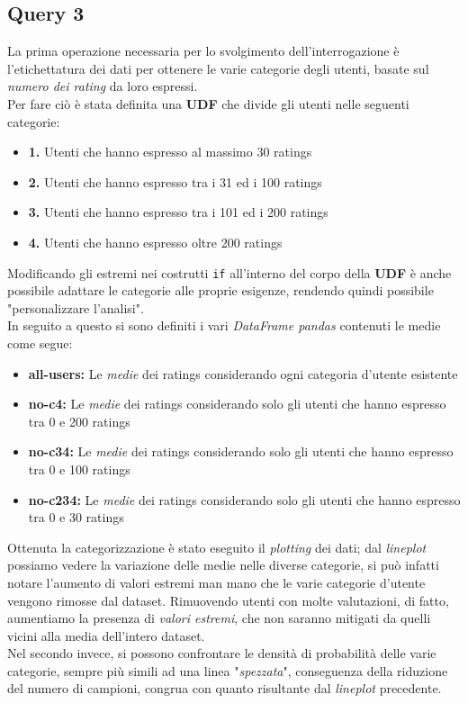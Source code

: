 \documentclass{article}
\begin{document}
    \newpage
    \subsection{Query 3}
        La prima operazione necessaria per lo svolgimento dell'interrogazione è l'etichettatura dei dati per ottenere le varie categorie degli utenti, basate sul \textit{numero dei rating} da loro espressi.\\
        Per fare ciò è stata definita una \textbf{UDF} che divide gli utenti nelle seguenti categorie:
        \begin{itemize}
            \item \textbf{1.} Utenti che hanno espresso al massimo 30 ratings
            \item \textbf{2.} Utenti che hanno espresso tra i 31 ed i 100 ratings
            \item \textbf{3.} Utenti che hanno espresso tra i 101 ed i 200 ratings
            \item \textbf{4.} Utenti che hanno espresso oltre 200 ratings
        \end{itemize}
        Modificando gli estremi nei costrutti \texttt{if} all'interno del corpo della \textbf{UDF} è anche possibile adattare le categorie alle proprie esigenze, rendendo quindi possibile "personalizzare l'analisi".\\
        In seguito a questo si sono definiti i vari \textit{DataFrame pandas} contenuti le medie come segue:
        \begin{itemize}
            \item \textbf{all-users:} Le \textit{medie} dei ratings considerando ogni categoria d'utente esistente
            \item \textbf{no-c4: } Le \textit{medie} dei ratings considerando solo gli utenti che hanno espresso tra 0 e 200 ratings
            \item \textbf{no-c34: } Le \textit{medie} dei ratings considerando solo gli utenti che hanno espresso tra 0 e 100 ratings
            \item \textbf{no-c234: } Le \textit{medie} dei ratings considerando solo gli utenti che hanno espresso tra 0 e 30 ratings
        \end{itemize}
        Ottenuta la categorizzazione è stato eseguito il \textit{plotting} dei dati; dal \textit{lineplot} possiamo vedere la variazione delle medie nelle diverse categorie, si può infatti notare l'aumento di valori estremi man mano che le varie categorie d'utente vengono rimosse dal dataset. Rimuovendo utenti con molte valutazioni, di fatto, aumentiamo la presenza di \textit{valori estremi}, che non saranno mitigati da quelli vicini alla media dell'intero dataset.\\
        Nel secondo invece, si possono confrontare le densità di probabilità delle varie categorie, sempre più simili ad una linea "\textit{spezzata}", conseguenza della riduzione del numero di campioni, congrua con quanto risultante dal \textit{lineplot} precedente.
\end{document}

